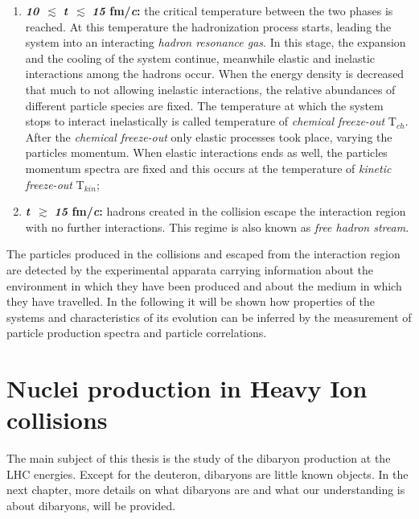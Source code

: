 \begin{enumerate}
    \item \textbf{\textit{10}} $\, \pmb{\lesssim}$ \textbf{\textit{t}} $\, \pmb{\lesssim}$ \textbf{\textit{15} fm/\textit{c}:}
            the critical temperature between the two phases is reached. At this temperature the hadronization process
            starts, leading the system into an interacting \textit{hadron resonance gas}. In this stage, the expansion
            and the cooling of the system continue, meanwhile elastic and inelastic interactions among the hadrons
            occur. 
            When the energy density is decreased that much to not allowing inelastic interactions, the relative 
            abundances of different particle species are fixed. The temperature at which the system stops to 
            interact inelastically is called temperature of \textit{chemical freeze-out} T$_{ch}$. After the
            \textit{chemical freeze-out} only elastic processes took place, varying the particles momentum.
            When elastic interactions ends as well, the particles momentum spectra are fixed and this occurs
            at the temperature of \textit{kinetic freeze-out} T$_{kin}$;

    \item \textbf{\textit{t}} $\, \pmb{\gtrsim}$ \textbf{\textit{15} fm/\textit{c}:} hadrons created in 
            the collision escape the interaction region with no further interactions. This regime is 
            also known as \textit{free hadron stream}.
\end{enumerate}

The particles produced in the collisions and escaped from the interaction region are detected by 
the experimental apparata carrying information about the environment in 
which they have been produced and about the medium in which they have travelled. 
In the following it will be shown how properties of the systems and characteristics of its 
evolution can be inferred by the measurement of particle production spectra and particle correlations.

%
%
\section{Nuclei production in Heavy Ion collisions} \label{sec:1.4}

The main subject of this thesis is the study of the \dst dibaryon production at the LHC energies.
Except for the deuteron, dibaryons are little known objects. In the next chapter, more details
on what dibaryons are and what our understanding is about dibaryons, will be provided. 

